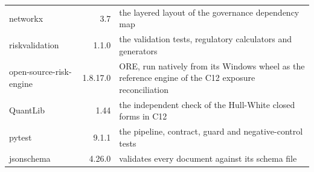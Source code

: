 {\begin{longtable}{lr>{\raggedright\arraybackslash}p{9.0cm}}
networkx & 3.7 & the layered layout of the governance dependency map \\
riskvalidation & 1.1.0 & the validation tests, regulatory calculators and generators \\
open-source-risk-engine & 1.8.17.0 & ORE, run natively from its Windows wheel as the reference engine of the C12 exposure reconciliation \\
QuantLib & 1.44 & the independent check of the Hull-White closed forms in C12 \\
pytest & 9.1.1 & the pipeline, contract, guard and negative-control tests \\
jsonschema & 4.26.0 & validates every document against its schema file \\
\end{longtable}
}
